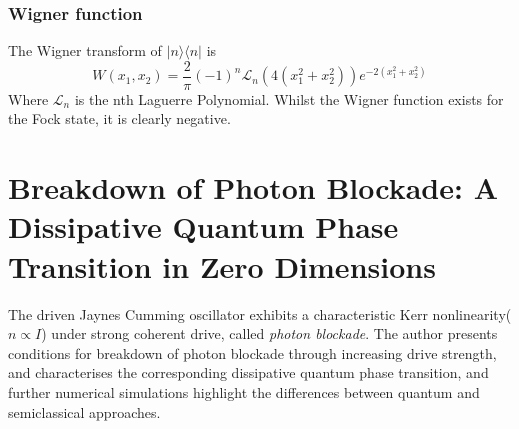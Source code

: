 \documentclass[reqno]{amsart}
\newcommand{\ket}[1]{| #1 \rangle}
\newcommand{\bra}[1]{\langle #1 |}
\begin{document}
\subsubsection{Wigner function}

The Wigner transform of $\ket{n}\bra{n}$ is\autocite[65]{Walls2008}
\begin{equation}
	W(x_1, x_2) = \frac{2}{\pi} (-1)^n \mathscr{L}_n(4(x_1^2+x_2^2))e^{-2(x_1^2+x_2^2)}
\end{equation}
Where $\mathscr{L}_n$ is the nth Laguerre Polynomial. Whilst the Wigner function exists for the Fock state, it is clearly negative.

\section{Breakdown of Photon Blockade: A Dissipative Quantum Phase Transition in Zero Dimensions}

The driven Jaynes Cumming oscillator exhibits a characteristic Kerr nonlinearity($n \propto I$) under strong coherent drive, called \emph{photon blockade}\autocite{Carmichael2015}. The author presents conditions for breakdown of photon blockade through increasing drive strength, and characterises the corresponding dissipative quantum phase transition, and further numerical simulations highlight the differences between quantum and semiclassical approaches. 
\end{document}
